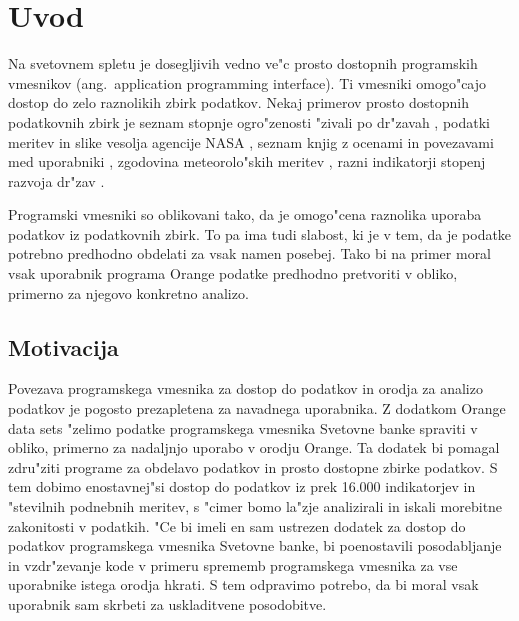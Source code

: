 
\chapter{Uvod}

Na svetovnem spletu je dosegljivih vedno ve"c prosto dostopnih programskih
vmesnikov (ang.\ application programming interface). 
Ti vmesniki omogo"cajo dostop
do zelo raznolikih zbirk podatkov. Nekaj primerov prosto dostopnih podatkovnih
zbirk je seznam stopnje ogro"zenosti "zivali po dr"zavah 
    ,
podatki meritev in slike vesolja agencije NASA
    ,
seznam knjig z ocenami in povezavami med uporabniki 
    ,
zgodovina meteorolo"skih meritev 
    ,
razni indikatorji stopenj razvoja dr"zav
    .

Programski vmesniki so oblikovani tako, da je omogo"cena raznolika uporaba
podatkov iz podatkovnih zbirk. To pa ima tudi slabost, ki je v tem, da je 
podatke potrebno predhodno obdelati za vsak namen posebej. Tako bi na primer 
moral vsak uporabnik programa Orange podatke predhodno pretvoriti v obliko, 
primerno za njegovo konkretno analizo.


\section{Motivacija}


Povezava programskega vmesnika za dostop do podatkov in orodja za analizo 
podatkov je pogosto prezapletena za navadnega uporabnika. Z dodatkom Orange
data sets "zelimo podatke programskega vmesnika Svetovne banke spraviti v 
obliko, primerno za nadaljnjo
uporabo v orodju Orange. Ta dodatek bi pomagal zdru"ziti programe za obdelavo
podatkov in prosto dostopne zbirke podatkov. S tem dobimo enostavnej"si dostop 
do podatkov iz prek 16.000 indikatorjev in "stevilnih podnebnih meritev,
s "cimer bomo la"zje analizirali in iskali morebitne zakonitosti v podatkih.
"Ce bi imeli en sam ustrezen dodatek za dostop do podatkov programskega 
vmesnika Svetovne banke, bi poenostavili posodabljanje in
vzdr"zevanje kode v primeru sprememb programskega vmesnika za vse uporabnike
istega orodja hkrati. S tem odpravimo potrebo, da bi moral vsak uporabnik sam
skrbeti za uskladitvene posodobitve.


